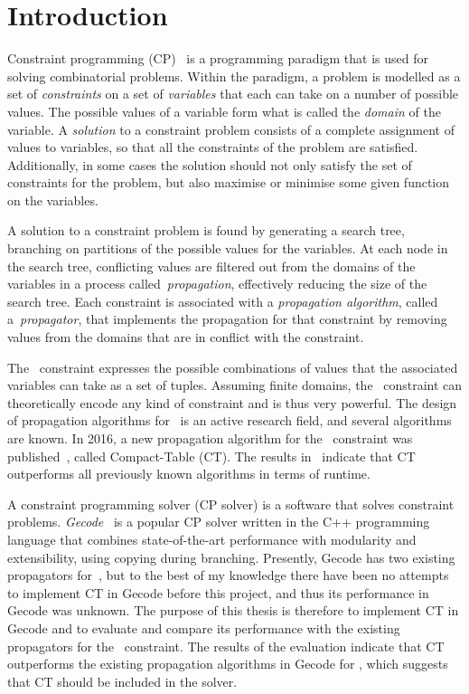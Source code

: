 \documentclass[a4paper,11pt]{article}
\theoremstyle{definition}
\newcommand{\Table}{\Constraint{Table}}
\newcommand{\CTpaper}[0]{DBLP:conf/cp/DemeulenaereHLP16}
\numberwithin{equation}{section}
\begin{document}
\newpage

\tableofcontents

\newpage

\section{Introduction}
\label{intro}


Constraint programming (CP)~\cite{Apt:constraintsBook}
is a programming paradigm that is used for solving
combinatorial problems. Within the paradigm, a problem is
modelled as a set of \emph{constraints} on a
set of \emph{variables} that each can take on a number of
possible values. The possible values of
a variable form what is called the \emph{domain} of the variable.
A \emph{solution} to a constraint problem consists of a complete assignment
of values to variables, so that all the constraints of the problem
are satisfied. Additionally, in some cases the solution should not only
satisfy the set of constraints for the
problem, but also maximise or minimise some given function on the variables.

A solution to a constraint problem is found by generating a search
tree, branching on partitions of the possible values for the variables.
At each node in the search tree, conflicting values are filtered out
from the domains of the variables in a process called~\emph{propagation},
effectively reducing the size of the search tree.
Each constraint is associated with a \emph{propagation algorithm},
called a~\emph{propagator},
that implements the propagation for that constraint by removing
values from the domains that are in conflict with the constraint.

The \Table~constraint expresses the possible combinations of values
that the associated variables can take as a set of tuples.
Assuming finite domains, the \Table~constraint can theoretically
encode any kind of constraint and is thus very powerful.
The design of propagation algorithms for \Table~is an active research field,
and several algorithms are known. In 2016, a new propagation algorithm for the
\Table~constraint was published~\cite{\CTpaper}, called Compact-Table (CT).
The results in~\cite{\CTpaper} indicate that CT outperforms all previously
known algorithms in terms of runtime.

A constraint programming solver (CP solver) is a software that solves constraint problems.
\emph{Gecode}~\cite{Gecode} is a popular CP solver written in the C++ programming language
that combines state-of-the-art performance with modularity and extensibility,
using copying during branching.
Presently, Gecode has two existing propagators for~\Table,
but to the best of my knowledge there have been no attempts to implement
CT in Gecode before this project, and thus its performance in Gecode was unknown.
The purpose of this thesis is therefore to implement CT in Gecode and to evaluate
and compare its performance with the existing propagators for
the \Table~constraint.
The results of the evaluation indicate that CT outperforms
the existing propagation algorithms in Gecode for \Table,
which suggests that CT should be included in the solver.
\end{document}
